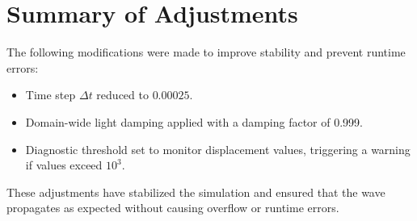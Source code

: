 \documentclass{article}
\begin{document}
\section{Summary of Adjustments}

The following modifications were made to improve stability and prevent runtime errors:
\begin{itemize}
    \item Time step $\Delta t$ reduced to $0.00025$.
    \item Domain-wide light damping applied with a damping factor of 0.999.
    \item Diagnostic threshold set to monitor displacement values, triggering a warning if values exceed $10^3$.
\end{itemize}

These adjustments have stabilized the simulation and ensured that the wave propagates as expected without causing overflow or runtime errors.
\end{document}

